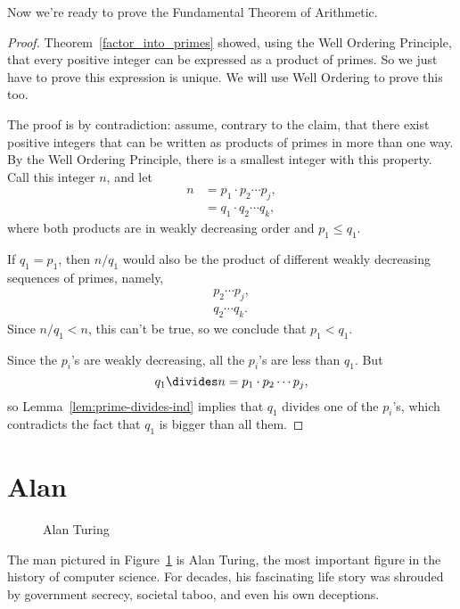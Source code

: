 Now we're ready to prove the Fundamental Theorem of Arithmetic.
\begin{proof}
Theorem~\ref{factor_into_primes} showed, using the Well Ordering
Principle, that every positive integer can be expressed as a product
of primes.  So we just have to prove this expression is unique.  We
will use Well Ordering to prove this too.

The proof is by contradiction: assume, contrary to the claim, that
there exist positive integers that can be written as products of
primes in more than one way.  By the Well Ordering Principle, there is
a smallest integer with this property.  Call this integer $n$, and let
\begin{align*}
n & = p_1 \cdot p_2 \cdots p_j, \\
& = q_1 \cdot q_2 \cdots q_k,
\end{align*}
where both products are in weakly decreasing order and $p_1 \le q_1$.

If $q_1 = p_1$, then $n/q_1$ would also be the product of different
weakly decreasing sequences of primes, namely,
\begin{align*}
 p_2 \cdots p_j, \\
q_2 \cdots q_k.
\end{align*}
Since $n/q_1 < n$, this can't be true, so we conclude that $p_1 <
q_1$.

Since the $p_i$'s are weakly decreasing, all the $p_i$'s are less than
$q_1$.  But
\[
q_1\divides n= p_1 \cdot p_2 \cdots p_j,
\]
so Lemma~\ref{lem:prime-divides-ind} implies that $q_1$ divides one of
the $p_i$'s, which contradicts the fact that $q_1$ is bigger than all
them.
\end{proof}

\begin{problems}
\classproblems {}

\homeworkproblems {}

\end{problems}

\section{Alan }\label{Turing_sec}

\begin{figure}\redrawntrue
{}
\caption{Alan Turing}
\label{fig:Turing}
\end{figure}

The man pictured in Figure~\ref{fig:Turing} is Alan Turing, the most
important figure in the history of computer science.  For decades, his
fascinating life story was shrouded by government secrecy, societal
taboo, and even his own deceptions.

